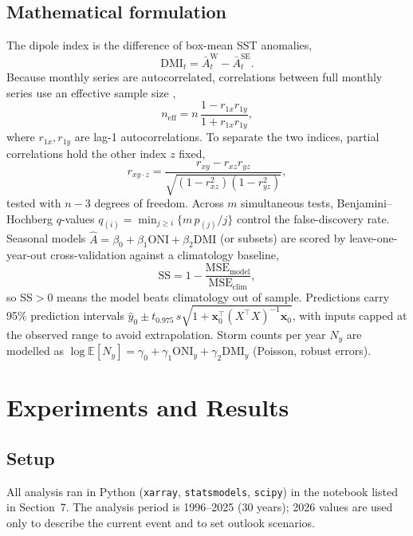 \documentclass{article}
\begin{document}
\subsection{Mathematical formulation}
The dipole index is the difference of box-mean SST anomalies,
\begin{equation}
\text{DMI}_t=\bar{A}^{\mathrm{W}}_t-\bar{A}^{\mathrm{SE}}_t .
\end{equation}
Because monthly series are autocorrelated, correlations between full monthly series use an effective
sample size \cite{bretherton1999},
\begin{equation}
n_{\mathrm{eff}}=n\,\frac{1-r_{1x}r_{1y}}{1+r_{1x}r_{1y}},
\end{equation}
where $r_{1x},r_{1y}$ are lag-1 autocorrelations. To separate the two indices, partial correlations
hold the other index $z$ fixed,
\begin{equation}
r_{xy\cdot z}=\frac{r_{xy}-r_{xz}r_{yz}}{\sqrt{(1-r_{xz}^{2})(1-r_{yz}^{2})}},
\end{equation}
tested with $n-3$ degrees of freedom. Across $m$ simultaneous tests, Benjamini--Hochberg
\cite{benjamini1995} $q$-values $q_{(i)}=\min_{j\geq i}\{m\,p_{(j)}/j\}$ control the false-discovery
rate. Seasonal models $\hat{A}=\beta_0+\beta_1\text{ONI}+\beta_2\text{DMI}$ (or subsets) are scored by
leave-one-year-out cross-validation against a climatology baseline,
\begin{equation}
\text{SS}=1-\frac{\text{MSE}_{\text{model}}}{\text{MSE}_{\text{clim}}},
\end{equation}
so SS$>0$ means the model beats climatology out of sample. Predictions carry 95\% prediction intervals
$\hat{y}_0\pm t_{0.975}\,s\sqrt{1+\mathbf{x}_0^{\top}(X^{\top}X)^{-1}\mathbf{x}_0}$, with inputs
capped at the observed range to avoid extrapolation. Storm counts per year $N_y$ are modelled as
$\log\mathbb{E}[N_y]=\gamma_0+\gamma_1\text{ONI}_y+\gamma_2\text{DMI}_y$ (Poisson, robust errors).

\section{Experiments and Results}

\subsection{Setup}
All analysis ran in Python (\texttt{xarray}, \texttt{statsmodels}, \texttt{scipy}) in the notebook
listed in Section~7. The analysis period is 1996--2025 (30 years); 2026 values are used only to
describe the current event and to set outlook scenarios.
\end{document}

